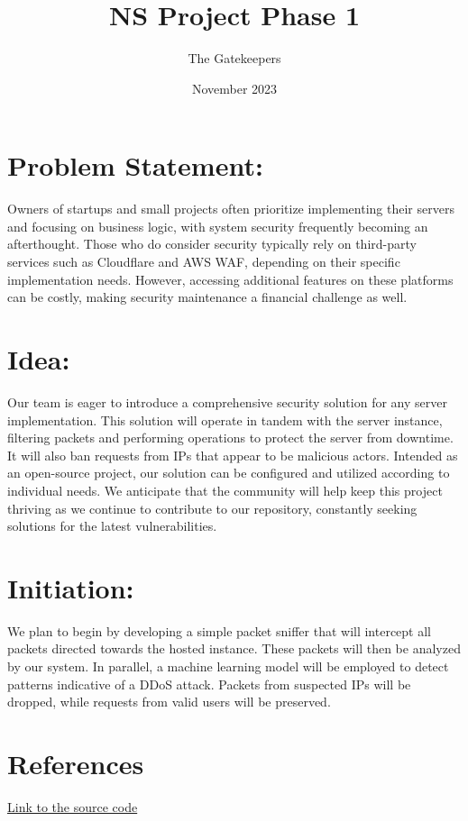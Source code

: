 \documentclass{article}
\title{NS Project Phase 1}
\author{The Gatekeepers}
\date{November 2023}
\begin{document}
\maketitle

\section{Problem Statement:}

Owners of startups and small projects often prioritize implementing their servers and focusing on business logic, with system security frequently becoming an afterthought. Those who do consider security typically rely on third-party services such as Cloudflare and AWS WAF, depending on their specific implementation needs. However, accessing additional features on these platforms can be costly, making security maintenance a financial challenge as well. 

\section{Idea:}

Our team is eager to introduce a comprehensive security solution for any server implementation. This solution will operate in tandem with the server instance, filtering packets and performing operations to protect the server from downtime. It will also ban requests from IPs that appear to be malicious actors. Intended as an open-source project, our solution can be configured and utilized according to individual needs. We anticipate that the community will help keep this project thriving as we continue to contribute to our repository, constantly seeking solutions for the latest vulnerabilities. 

\section{Initiation:}

We plan to begin by developing a simple packet sniffer that will intercept all packets directed towards the hosted instance. These packets will then be analyzed by our system. In parallel, a machine learning model will be employed to detect patterns indicative of a DDoS attack. Packets from suspected IPs will be dropped, while requests from valid users will be preserved. 

\section{References}

\href{https://github.com/R3d1001/openflare/blob/main/NSPP1.tex}{Link to the source code}
\end{document}
